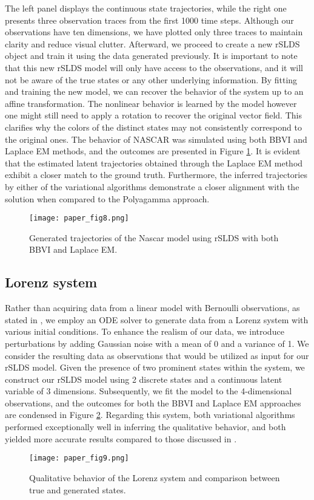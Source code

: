 The left panel displays the continuous state trajectories, while the right one presents three observation traces from the first 1000 time steps. Although our observations have ten dimensions, we have plotted only three traces to maintain clarity and reduce visual clutter. Afterward, we proceed to create a new rSLDS object and train it using the data generated previously. It is important to note that this new rSLDS model will only have access to the observations, and it will not be aware of the true states or any other underlying information. By fitting and training the new model, we can recover the behavior of the system up to an affine transformation. The nonlinear behavior is learned by the model however one might still need to apply a rotation to recover the original vector field. This clarifies why the colors of the distinct states may not consistently correspond to the original ones. The behavior of NASCAR was simulated using both BBVI and Laplace EM methods, and the outcomes are presented in Figure \ref{generatedNascar}. It is evident that the estimated latent trajectories obtained through the Laplace EM method exhibit a closer match to the ground truth. Furthermore, the inferred trajectories by either of the variational algorithms demonstrate a closer alignment with the solution when compared to the Polyagamma approach.
\begin{figure}[h!]
	\centering
	\texttt{[image: paper\_fig8.png]}
	\caption{Generated trajectories of the Nascar model using rSLDS with both BBVI and Laplace EM.}
	\label{generatedNascar}
\end{figure}

\subsection{Lorenz system}
Rather than acquiring data from a linear model with Bernoulli observations, as stated in \cite{linderman_bayesian_2017}, we employ an ODE solver to generate data from a Lorenz system with various initial conditions. To enhance the realism of our data, we introduce perturbations by adding Gaussian noise with a mean of 0 and a variance of 1. We consider the resulting data as observations that would be utilized as input for our rSLDS model. Given the presence of two prominent states within the system, we construct our rSLDS model using 2 discrete states and a continuous latent variable of 3 dimensions. Subsequently, we fit the model to the 4-dimensional observations, and the outcomes for both the BBVI and Laplace EM approaches are condensed in Figure \ref{lorenz}. Regarding this system, both variational algorithms performed exceptionally well in inferring the qualitative behavior, and both yielded more accurate results compared to those discussed in \cite{linderman_bayesian_2017}.
\begin{figure}[h!]
	\centering
	\texttt{[image: paper\_fig9.png]}
	\caption{Qualitative behavior of the Lorenz system and comparison between true and generated states.}
	\label{lorenz}
\end{figure}
